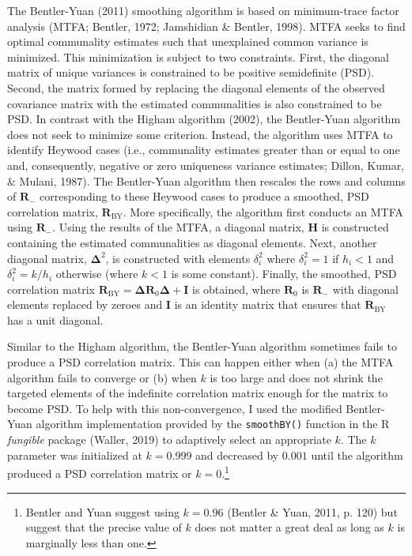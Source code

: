 \documentclass[
  english,
  man]{apa6}
\begin{document}
The Bentler-Yuan (2011) smoothing algorithm is based on minimum-trace factor analysis (MTFA; Bentler, 1972; Jamshidian \& Bentler, 1998). MTFA seeks to find optimal communality estimates such that unexplained common variance is minimized. This minimization is subject to two constraints. First, the diagonal matrix of unique variances is constrained to be positive semidefinite (PSD). Second, the matrix formed by replacing the diagonal elements of the observed covariance matrix with the estimated communalities is also constrained to be PSD. In contrast with the Higham algorithm (2002), the Bentler-Yuan algorithm does not seek to minimize some criterion. Instead, the algorithm uses MTFA to identify Heywood cases (i.e., communality estimates greater than or equal to one and, consequently, negative or zero uniqueness variance estimates; Dillon, Kumar, \& Mulani, 1987). The Bentler-Yuan algorithm then rescales the rows and columns of \(\mathbf{R}_{-}\) corresponding to these Heywood cases to produce a smoothed, PSD correlation matrix, \(\mathbf{R}_{\textrm{BY}}\). More specifically, the algorithm first conducts an MTFA using \(\mathbf{R}_{-}\). Using the results of the MTFA, a diagonal matrix, \(\mathbf{H}\) is constructed containing the estimated communalities as diagonal elements. Next, another diagonal matrix, \(\mathbf{\Delta}^2\), is constructed with elements \(\delta_i^2\) where \(\delta_i^2 = 1\) if \(h_i < 1\) and \(\delta_i^2 = k / h_i\) otherwise (where \(k < 1\) is some constant). Finally, the smoothed, PSD correlation matrix \(\mathbf{R}_{\textrm{BY}}= \mathbf{\Delta} \mathbf{R}_0 \mathbf{\Delta} + \mathbf{I}\) is obtained, where \(\mathbf{R}_0\) is \(\mathbf{R}_{-}\) with diagonal elements replaced by zeroes and \(\mathbf{I}\) is an identity matrix that ensures that \(\mathbf{R}_{\textrm{BY}}\) has a unit diagonal.

Similar to the Higham algorithm, the Bentler-Yuan algorithm sometimes fails to produce a PSD correlation matrix. This can happen either when (a) the MTFA algorithm fails to converge or (b) when \(k\) is too large and does not shrink the targeted elements of the indefinite correlation matrix enough for the matrix to become PSD. To help with this non-convergence, I used the modified Bentler-Yuan algorithm implementation provided by the \texttt{smoothBY()} function in the R \emph{fungible} package (Waller, 2019) to adaptively select an appropriate \(k\). The \(k\) parameter was initialized at \(k = 0.999\) and decreased by \(0.001\) until the algorithm produced a PSD correlation matrix or \(k = 0\).\footnote{Bentler and Yuan suggest using \(k = 0.96\) (Bentler \& Yuan, 2011, p. 120) but suggest that the precise value of \(k\) does not matter a great deal as long as \(k\) is marginally less than one.}
\end{document}
